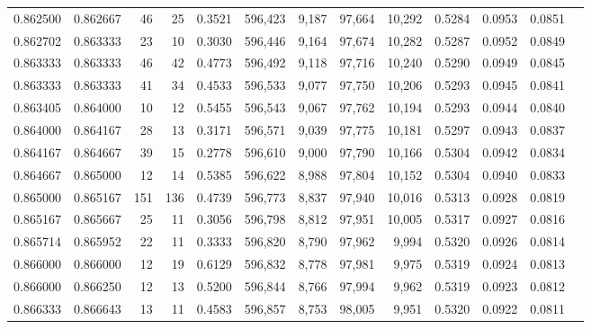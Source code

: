 \begin{tabular}{rrrrrrrrrrrrr}
0.862500 & 0.862667 &    46 &  25 &                                     0.3521 & 596,423 &   9,187 &  97,664 &  10,292 & 0.5284 & 0.0953 & 0.0851 \\
0.862702 & 0.863333 &    23 &  10 &                                     0.3030 & 596,446 &   9,164 &  97,674 &  10,282 & 0.5287 & 0.0952 & 0.0849 \\
0.863333 & 0.863333 &    46 &  42 &                                     0.4773 & 596,492 &   9,118 &  97,716 &  10,240 & 0.5290 & 0.0949 & 0.0845 \\
0.863333 & 0.863333 &    41 &  34 &                                     0.4533 & 596,533 &   9,077 &  97,750 &  10,206 & 0.5293 & 0.0945 & 0.0841 \\
0.863405 & 0.864000 &    10 &  12 &                                     0.5455 & 596,543 &   9,067 &  97,762 &  10,194 & 0.5293 & 0.0944 & 0.0840 \\
0.864000 & 0.864167 &    28 &  13 &                                     0.3171 & 596,571 &   9,039 &  97,775 &  10,181 & 0.5297 & 0.0943 & 0.0837 \\
0.864167 & 0.864667 &    39 &  15 &                                     0.2778 & 596,610 &   9,000 &  97,790 &  10,166 & 0.5304 & 0.0942 & 0.0834 \\
0.864667 & 0.865000 &    12 &  14 &                                     0.5385 & 596,622 &   8,988 &  97,804 &  10,152 & 0.5304 & 0.0940 & 0.0833 \\
0.865000 & 0.865167 &   151 & 136 &                                     0.4739 & 596,773 &   8,837 &  97,940 &  10,016 & 0.5313 & 0.0928 & 0.0819 \\
0.865167 & 0.865667 &    25 &  11 &                                     0.3056 & 596,798 &   8,812 &  97,951 &  10,005 & 0.5317 & 0.0927 & 0.0816 \\
0.865714 & 0.865952 &    22 &  11 &                                     0.3333 & 596,820 &   8,790 &  97,962 &   9,994 & 0.5320 & 0.0926 & 0.0814 \\
0.866000 & 0.866000 &    12 &  19 &                                     0.6129 & 596,832 &   8,778 &  97,981 &   9,975 & 0.5319 & 0.0924 & 0.0813 \\
0.866000 & 0.866250 &    12 &  13 &                                     0.5200 & 596,844 &   8,766 &  97,994 &   9,962 & 0.5319 & 0.0923 & 0.0812 \\
0.866333 & 0.866643 &    13 &  11 &                                     0.4583 & 596,857 &   8,753 &  98,005 &   9,951 & 0.5320 & 0.0922 & 0.0811 \\

\end{tabular}
